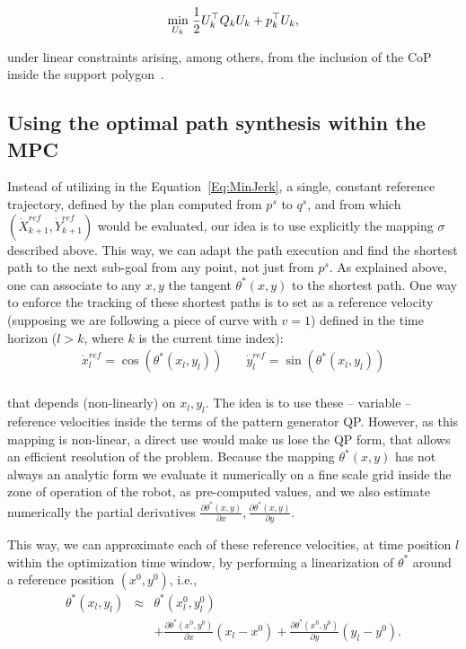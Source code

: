 \begin{equation}
 \underset{U_k}{\min} \; \dfrac{1}{2} U_k^{\top} Q_k U_k + p_k^{\top} U_k,
\label{Eq:QP}
\end{equation}

under linear constraints arising, among others, from the inclusion of the CoP inside the support polygon~\cite{HerdtAR2010}.

\subsection{Using the optimal path synthesis within the MPC}

Instead of utilizing in the Equation~\ref{Eq:MinJerk}, a single, constant reference trajectory, defined by the plan computed from $p^s$ to $q^s$, and from which $(\dot{X}_{k+1}^{ref},\dot{Y}_{k+1}^{ref})$ would be evaluated, our idea is to use explicitly the mapping $\sigma$ described above. This way, we can adapt the path execution and find the shortest path to the next sub-goal from any point, not just from $p^s$. As explained above, one can  associate to any $x,y$ the tangent $\theta^*(x,y)$ to the shortest path. One way to enforce the tracking of these shortest paths is to set as a reference velocity (supposing we are following a piece of curve with $v=1$) defined in the time horizon ($l>k$, where $k$ is the current time index):
$$
\begin{array}{ccc}
\dot{x}^{ref}_l =  \cos(\theta^*(x_l,y_l)) & \; & \dot{y}^{ref}_l =  \sin(\theta^*(x_l,y_l)) \\
\end{array}
$$

that depends (non-linearly) on $x_l,y_l$. The idea is to use these -- variable -- reference velocities inside the terms of the pattern generator QP. However, as this mapping is non-linear, a direct use would make us lose the QP form, that allows an efficient resolution of the problem. Because the mapping $\theta^*(x,y)$ has not always an analytic form we evaluate it numerically on a fine scale grid inside the zone of operation of the robot, as pre-computed values, and we also estimate numerically the partial derivatives $\frac{\partial \theta^*(x,y)}{\partial x},  \frac{\partial \theta^*(x,y)}{\partial y}$.

This way, we can approximate each of these reference velocities, at time position $l$ within the optimization time window, by performing a linearization of $\theta^*$  around a reference position $(x^0,y^0)$, i.e.,
$$
\begin{array}{ccc}
\theta^*(x_l,y_l) & \approx & \theta^*(x^0_l,y^0_l)  \\
& & + \frac{\partial \theta^*(x^0,y^0)}{\partial x} (x_l-x^0) + \frac{\partial \theta^*(x^0,y^0)}{\partial y} (y_l-y^0).
\end{array}
$$

